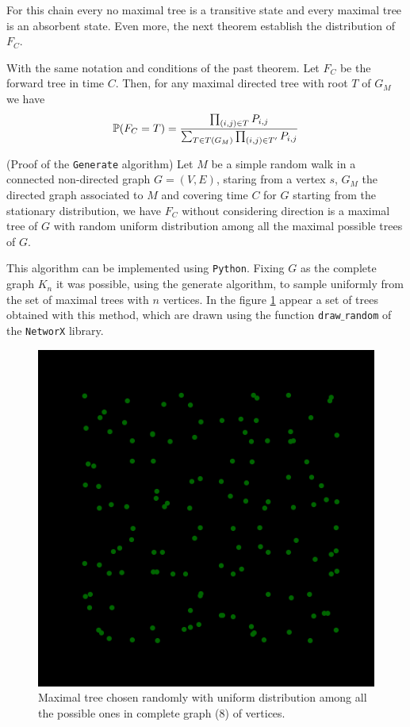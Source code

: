 For this chain every no maximal tree is a transitive state and every maximal tree is an absorbent state. Even more, the next theorem establish the distribution of  $F_{C}$.

\begin{theorem}
With the same notation and conditions of the past theorem. Let $F_{C}$ be the forward tree in time $C$. Then, for any maximal directed tree with root $T$ of $G_{M}$ we have
$$\P(F_{C} = T) = \frac{\prod_{(i,j)\in T} P_{i,j}}{\sum_{T\in T(G_{M})} \prod_{(i,j)\in T'} P_{i,j}}$$
\end{theorem}

\begin{coro}
(Proof of the \texttt{Generate} algorithm) Let $M$ be a simple random walk in a connected non-directed graph $G = (V, E)$, staring from a vertex $s$, $G_{M}$ the directed graph associated to $M$ and covering time $C$ for $G$ starting from the stationary distribution, we have $F_{C}$ without considering direction is a maximal tree of $G$ with random uniform distribution among all the maximal possible trees of $G$.
\end{coro}

This algorithm can be implemented using \texttt{Python}. Fixing $G$ as the complete graph $K_{n}$ it was possible, using the generate algorithm, to sample uniformly from the set of maximal trees with $n$ vertices. In the figure \ref{fig:Arboles8} appear a set of trees obtained with this method, which are drawn using the function \texttt{draw$\_$random} of the \texttt{NetworX} library.

\begin{figure}[h!]
	\centering
	\includegraphics[scale=0.8]{Python/Figures/Arboles8.png}
	\caption{Maximal tree chosen randomly with uniform distribution among all the possible ones in complete graph (8) of vertices.}	
	\label{fig:Arboles8}
\end{figure}

